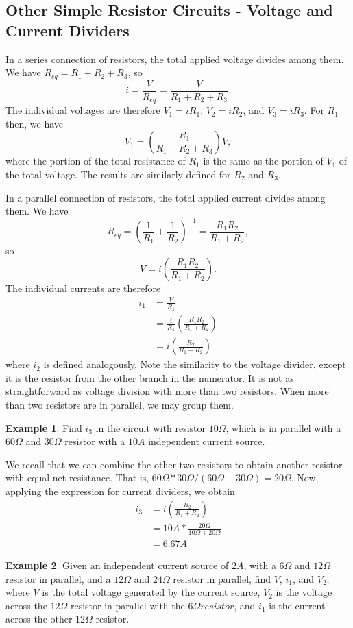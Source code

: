 \documentclass[11pt]{article}
\theoremstyle{plain} %
\theoremstyle{definition}
\theoremstyle{example}
\newtheorem*{example}{Example}
\theoremstyle{remark}
\begin{document}
\subsection{Other Simple Resistor Circuits - Voltage and Current Dividers}

In a series connection of resistors, the total applied voltage divides among them. We have $R_{eq} = R_1 + R_2 + R_3$, so $$i = \frac{V}{R_{eq}} = \frac{V}{R_1 + R_2+R_3}.$$ The individual voltages are therefore $V_1 = iR_1$, $V_2 = iR_2$, and $V_3 = iR_3$. For $R_1$ then, we have 
$$V_1 = \left(\frac{R_1}{R_1+R_2+R_3}\right)V,$$
where the portion of the total resistance of $R_1$ is the same as the portion of $V_1$ of the total voltage. The results are similarly defined for $R_2$ and $R_3$.

In a parallel connection of resistors, the total applied current divides among them. We have $$R_{eq} = \left(\frac{1}{R_1} + \frac{1}{R_2}\right)^{-1} = \frac{R_1R_2}{R_1+R_2},$$
so $$V = i\left( \frac{R_1R_2}{R_1+R_2}\right).$$ The individual currents are therefore 
\begin{align*}
i_1 &= \frac{V}{R_1} \\
&= \frac{i}{R_1}\left( \frac{R_1R_2}{R_1+R_2}\right)\\
&= i\left( \frac{R_2}{R_1+R_2}\right)
\end{align*}
where $i_2$ is defined analogously. Note the similarity to the voltage divider, except it is the resistor from the other branch in the numerator. It is not as straightforward as voltage division with more than two resistors. When more than two resistors are in parallel, we may group them. 

\begin{example}
Find $i_3$ in the circuit with resistor $10\Omega$, which is in parallel with a $60\Omega$ and $30\Omega$ resistor with a $10A$ independent current source. 
\end{example}

We recall that we can combine the other two resistors to obtain another resistor with equal net resistance. That is, 
$60\Omega*30\Omega/(60\Omega+30\Omega) = 20\Omega$. Now, applying the expression for current dividers, we obtain 
\begin{align*}
i_3 &= i\left( \frac{R_2}{R_1+R_2}\right)\\
&= 10A*\frac{20\Omega}{10\Omega + 20\Omega}\\
&= 6.67A
\end{align*}

\begin{example}
Given an independent current source of $2A$, with a $6\Omega$ and $12\Omega$ resistor in parallel, and a $12\Omega$ and $24\Omega$ resistor in parallel, find $V$, $i_1$, and $V_2$, where $V$ is the total voltage generated by the current source, $V_2$ is the voltage across the $12\Omega$ resistor in parallel with the $6\Omega resistor$, and $i_1$ is the current across the other $12\Omega$ resistor. 
\end{example}
\end{document}

